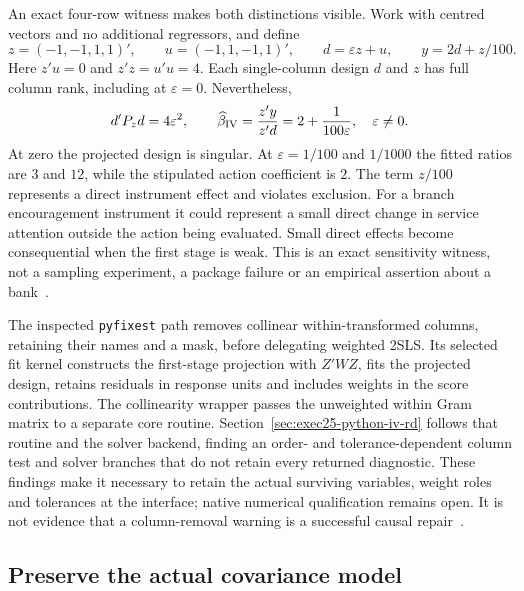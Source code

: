 An exact four-row witness makes both distinctions visible. Work with centred
vectors and no additional regressors, and define
\begin{equation}
 z=(-1,-1,1,1)',\qquad u=(-1,1,-1,1)',\qquad
 d=\varepsilon z+u,\qquad y=2d+z/100.
 \label{exec22:pyiv-witness}
\end{equation}
Here $z'u=0$ and $z'z=u'u=4$. Each single-column design $d$ and $z$ has full
column rank, including at $\varepsilon=0$. Nevertheless,
\begin{equation}
 d'P_zd=4\varepsilon^2,\qquad
 \widehat\beta_{\rm IV}=\frac{z'y}{z'd}
      =2+\frac{1}{100\varepsilon},\quad\varepsilon\ne0.
 \label{exec22:pyiv-ratio}
\end{equation}
At zero the projected design is singular. At $\varepsilon=1/100$ and $1/1000$
the fitted ratios are $3$ and $12$, while the stipulated action coefficient is
$2$. The term $z/100$ represents a direct instrument effect and violates
exclusion. For a branch encouragement instrument it could represent a small
direct change in service attention outside the action being evaluated.
Small direct effects become consequential when the first stage is weak.
This is an exact sensitivity witness, not a sampling experiment, a package
failure or an empirical assertion about a bank~\citep{exec22_pyiv_reference}.

The inspected \texttt{pyfixest} path removes collinear within-transformed
columns, retaining their names and a mask, before delegating weighted 2SLS.
Its selected fit kernel constructs the first-stage projection with $Z'WZ$,
fits the projected design, retains residuals in response units and includes
weights in the score contributions. The collinearity wrapper passes the
unweighted within Gram matrix to a separate core routine.
Section~\ref{sec:exec25-python-iv-rd} follows that routine and the solver
backend, finding an order- and tolerance-dependent column test and solver
branches that do not retain every returned diagnostic. These findings make
it necessary to retain the actual surviving variables, weight roles and
tolerances at the interface; native numerical qualification remains open. It is not evidence that a column-removal warning is a successful
causal repair~\citep{exec22_pyiv_kernels_pyfixest}.

\subsection{Preserve the actual covariance model}
\label{exec22:pyiv-covariance}

